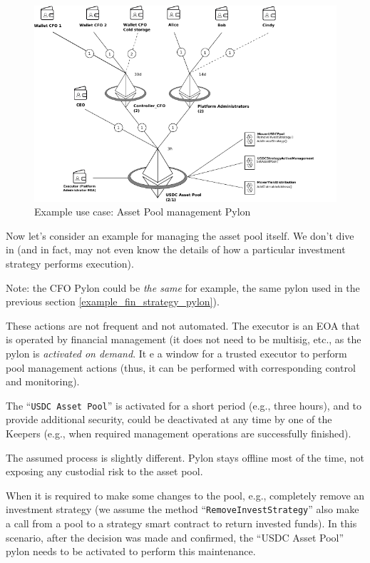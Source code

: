 \documentclass[12pt]{article}
\begin{document}
\begin{figure}[h!]
  \hspace*{-1cm}
    \includegraphics[width=1.25\textwidth]{pylon_example_pool_management.pdf}
    \caption[Figure 1]{Example use case: Asset Pool management Pylon\label{fig:pylon_example_asset_pool_mgmt}}
\end{figure}


Now let's consider an example for managing the asset pool itself. We don't dive in (and in fact, may not even know the details of how a particular investment strategy performs execution).

Note: the CFO Pylon could be \emph{the same} for example, the same pylon used in the previous section \ref{example_fin_strategy_pylon}).

These actions are not frequent and not automated. The executor is an EOA that is operated by financial management (it does not need to be multisig, etc., as the pylon is \emph{activated on demand}. It e a window for a trusted executor to perform pool management actions (thus, it can be performed with corresponding control and monitoring).

The ``\texttt{USDC Asset Pool}'' is activated for a short period (e.g., three hours), and to provide additional security, could be deactivated at any time by one of the Keepers (e.g., when required management operations are successfully finished).

The assumed process is slightly different. Pylon stays offline most of the time, not exposing any custodial risk to the asset pool.

When it is required to make some changes to the pool, e.g., completely remove an investment strategy (we assume the method ``\texttt{RemoveInvestStrategy}'' also make a call from a pool to a strategy smart contract to return invested funds). In this scenario, after the decision was made and confirmed, the ``USDC Asset Pool'' pylon needs to be activated to perform this maintenance.
\end{document}
